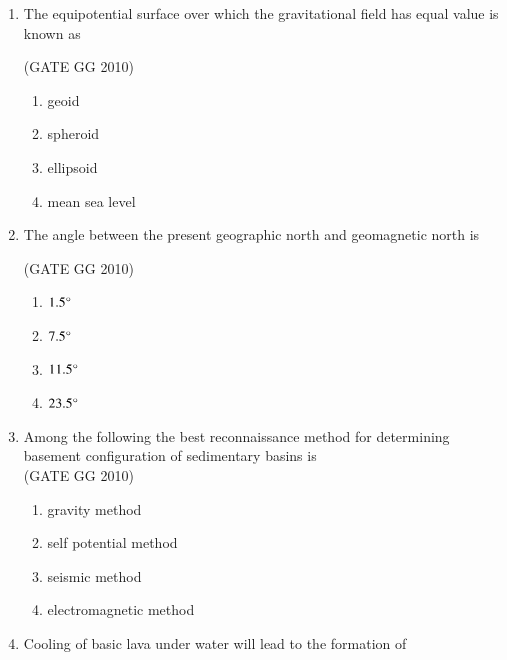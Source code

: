 \documentclass[journal]{IEEEtran}
\begin{document}
\begin{enumerate}[start=1]
\hfill{(GATE GG 2010)}

\begin{enumerate}
\end{enumerate}

\item The equipotential surface over which the gravitational field has equal value is known as 

\hfill{(GATE GG 2010)}

\begin{enumerate}
\item geoid
\item spheroid
\item ellipsoid
\item mean sea level
\end{enumerate} 

\item The angle between the present geographic north and geomagnetic north is

\hfill{(GATE GG 2010)}

\begin{enumerate}
\item$1.5\degree$
\item$7.5\degree$
\item$11.5\degree$
\item$23.5\degree$
\end{enumerate}

\item Among the following the best reconnaissance method for determining basement configuration of sedimentary basins is\\

\hspace*{15.7cm}(GATE GG 2010)

\begin{enumerate}
    \item gravity method
    \item self potential method
    \item seismic method
    \item electromagnetic method
\end{enumerate}

\item Cooling of basic lava under water will lead to the formation of


\end{enumerate}
\end{document}
